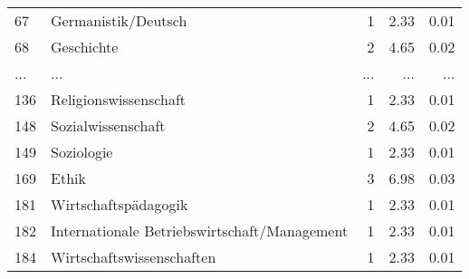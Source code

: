\begin{longtable}{lXrrr}
        67 & \multicolumn{1}{X}{Germanistik/Deutsch} & %
          \num{1} &
          \num[round-mode=places,round-precision=2]{2.33} &
          \num[round-mode=places,round-precision=2]{0.01} \\
        68 & \multicolumn{1}{X}{Geschichte} & %
          \num{2} &
          \num[round-mode=places,round-precision=2]{4.65} &
          \num[round-mode=places,round-precision=2]{0.02} \\
       ... & ... & ... & ... & ... \\
        136 & \multicolumn{1}{X}{Religionswissenschaft} & %
          \num{1} &
          \num[round-mode=places,round-precision=2]{2.33} &
          \num[round-mode=places,round-precision=2]{0.01} \\

        148 & \multicolumn{1}{X}{Sozialwissenschaft} & %
          \num{2} &
          \num[round-mode=places,round-precision=2]{4.65} &
          \num[round-mode=places,round-precision=2]{0.02} \\

        149 & \multicolumn{1}{X}{Soziologie} & %
          \num{1} &
          \num[round-mode=places,round-precision=2]{2.33} &
          \num[round-mode=places,round-precision=2]{0.01} \\

        169 & \multicolumn{1}{X}{Ethik} & %
          \num{3} &
          \num[round-mode=places,round-precision=2]{6.98} &
          \num[round-mode=places,round-precision=2]{0.03} \\

        181 & \multicolumn{1}{X}{Wirtschaftspädagogik} & %
          \num{1} &
          \num[round-mode=places,round-precision=2]{2.33} &
          \num[round-mode=places,round-precision=2]{0.01} \\

        182 & \multicolumn{1}{X}{Internationale Betriebswirtschaft/Management} & %
          \num{1} &
          \num[round-mode=places,round-precision=2]{2.33} &
          \num[round-mode=places,round-precision=2]{0.01} \\

        184 & \multicolumn{1}{X}{Wirtschaftswissenschaften} & %
          \num{1} &
          \num[round-mode=places,round-precision=2]{2.33} &
          \num[round-mode=places,round-precision=2]{0.01} \\


\end{longtable}

